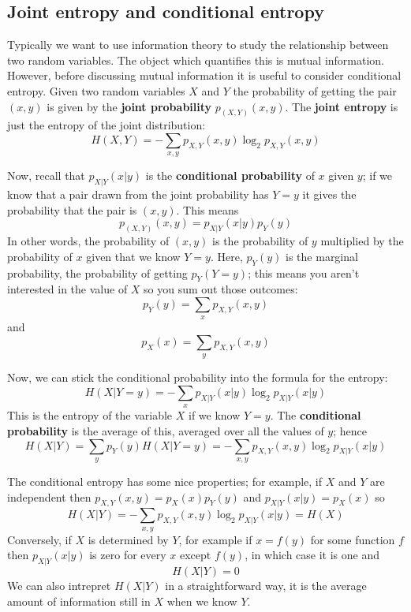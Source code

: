 \documentclass[12pt]{article}
\begin{document}
\subsection*{Joint entropy and conditional entropy}

Typically we want to use information theory to study the relationship
between two random variables. The object which quantifies this is
mutual information. However, before discussing mutual information it
is useful to consider conditional entropy. Given two random variables
$X$ and $Y$ the probability of getting the pair $(x,y)$ is given by
the \textbf{joint probability} $p_{(X,Y)}(x,y)$. The \textbf{joint
  entropy} is just the entropy of the joint distribution:
\begin{equation}
H(X,Y)=-\sum_{x,y}p_{X,Y}(x,y)\log_2{p_{X,Y}(x,y)}
\end{equation}

Now, recall that
$p_{X|Y}(x|y)$ is the \textbf{conditional probability} of $x$ given $y$; if we
know that a pair drawn from the joint probability has $Y=y$ it gives
the probability that the pair is $(x,y)$. This means
\begin{equation}
p_{(X,Y)}(x,y)=p_{X|Y}(x|y)p_Y(y)
\end{equation}
In other words, the probability of $(x,y)$ is the probability of $y$
multiplied by the probability of $x$ given that we know $Y=y$. Here,
$p_Y(y)$ is the marginal probability, the probability of getting $p_Y(Y=y)$; this means you aren't interested in the value of $X$ so you sum out those outcomes:
\begin{equation}
p_Y(y)=\sum_x p_{X,Y}(x,y)
\end{equation}
and
\begin{equation}
p_X(x)=\sum_y p_{X,Y}(x,y)
\end{equation}

Now, we can stick the conditional probability into the formula for the entropy:
\begin{equation}
H(X|Y=y)=-\sum_{x} p_{X|Y}(x|y)\log_2{p_{X|Y}(x|y)}
\end{equation}
This is the entropy of the variable $X$ if we know $Y=y$. The \textbf{conditional probability} is the average of this, averaged over all the values of $y$; hence
\begin{equation}
H(X|Y)=\sum_y p_Y(y) H(X|Y=y)=-\sum_{x,y}p_{X,Y}(x,y)\log_2{p_{X|Y}(x|y)}
\end{equation}

The conditional entropy has some nice properties; for example, if $X$
and $Y$ are independent then $p_{X,Y}(x,y)=p_X(x)p_Y(y)$ and
$p_{X|Y}(x|y)=p_X(x)$ so
\begin{equation}
H(X|Y)=-\sum_{x,y}p_{X,Y}(x,y)\log_2{p_{X|Y}(x|y)}=H(X)
\end{equation}
Conversely, if $X$ is determined by $Y$, for example if $x=f(y)$ for
some function $f$ then $p_{X|Y}(x|y)$ is zero for every $x$ except
$f(y)$, in which case it is one and
\begin{equation}
H(X|Y)=0
\end{equation}
We can also intrepret $H(X|Y)$ in a straightforward way, it is the
average amount of information still in $X$ when we know $Y$.
\end{document}
